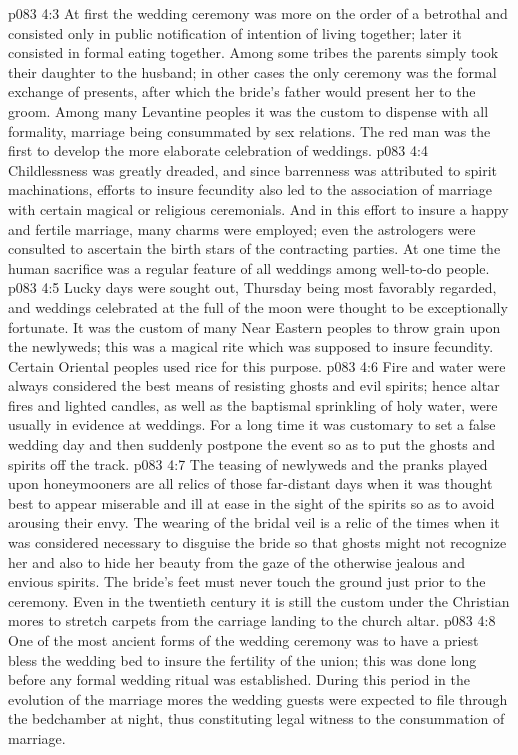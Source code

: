 \vs p083 4:3 At first the wedding ceremony was more on the order of a betrothal and consisted only in public notification of intention of living together; later it consisted in formal eating together. Among some tribes the parents simply took their daughter to the husband; in other cases the only ceremony was the formal exchange of presents, after which the bride’s father would present her to the groom. Among many Levantine peoples it was the custom to dispense with all formality, marriage being consummated by sex relations. The red man was the first to develop the more elaborate celebration of weddings.
\pc \vs p083 4:4 Childlessness was greatly dreaded, and since barrenness was attributed to spirit machinations, efforts to insure fecundity also led to the association of marriage with certain magical or religious ceremonials. And in this effort to insure a happy and fertile marriage, many charms were employed; even the astrologers were consulted to ascertain the birth stars of the contracting parties. At one time the human sacrifice was a regular feature of all weddings among well\hyp{}to\hyp{}do people.
\vs p083 4:5 Lucky days were sought out, Thursday being most favorably regarded, and weddings celebrated at the full of the moon were thought to be exceptionally fortunate. It was the custom of many Near Eastern peoples to throw grain upon the newlyweds; this was a magical rite which was supposed to insure fecundity. Certain Oriental peoples used rice for this purpose.
\vs p083 4:6 Fire and water were always considered the best means of resisting ghosts and evil spirits; hence altar fires and lighted candles, as well as the baptismal sprinkling of holy water, were usually in evidence at weddings. For a long time it was customary to set a false wedding day and then suddenly postpone the event so as to put the ghosts and spirits off the track.
\vs p083 4:7 The teasing of newlyweds and the pranks played upon honeymooners are all relics of those far\hyp{}distant days when it was thought best to appear miserable and ill at ease in the sight of the spirits so as to avoid arousing their envy. The wearing of the bridal veil is a relic of the times when it was considered necessary to disguise the bride so that ghosts might not recognize her and also to hide her beauty from the gaze of the otherwise jealous and envious spirits. The bride’s feet must never touch the ground just prior to the ceremony. Even in the twentieth century it is still the custom under the Christian mores to stretch carpets from the carriage landing to the church altar.
\vs p083 4:8 One of the most ancient forms of the wedding ceremony was to have a priest bless the wedding bed to insure the fertility of the union; this was done long before any formal wedding ritual was established. During this period in the evolution of the marriage mores the wedding guests were expected to file through the bedchamber at night, thus constituting legal witness to the consummation of marriage.
